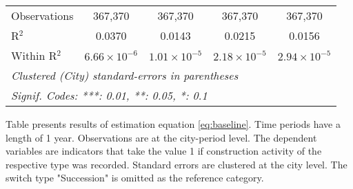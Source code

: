 \begin{table}[htbp]
\begin{tabular}{lcccc}
      Observations                               & 367,370               & 367,370               & 367,370               & 367,370\\  
      R$^2$                                      & 0.0370                & 0.0143                & 0.0215                & 0.0156\\  
      Within R$^2$                               & $6.66\times 10^{-6}$  & $1.01\times 10^{-5}$  & $2.18\times 10^{-5}$  & $2.94\times 10^{-5}$\\   
      \midrule \midrule
      \multicolumn{5}{l}{\emph{Clustered (City) standard-errors in parentheses}}\\
      \multicolumn{5}{l}{\emph{Signif. Codes: ***: 0.01, **: 0.05, *: 0.1}}\\
   \end{tabular}
   
   \par \raggedright 
   Table presents results of estimation equation \eqref{eq:baseline}. Time periods have a length of 1 year. Observations are at the city-period  level. The dependent variables are indicators that take the value 1 if  construction activity of the respective type was recorded. Standard errors are  clustered at the city level. The switch type "Succession" is omitted as the  reference category.
\end{table}

